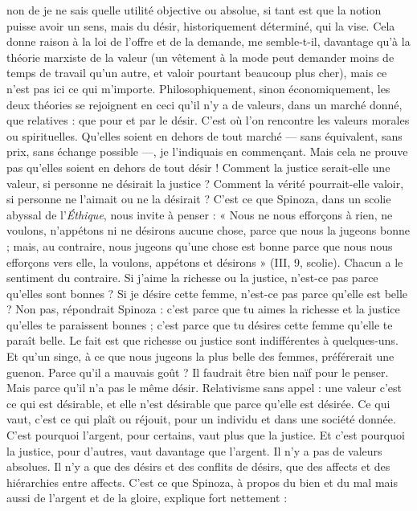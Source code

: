 non de je ne sais quelle utilité objective ou absolue, si tant est que la
notion puisse avoir un sens, mais du désir, historiquement déterminé, qui la
vise. Cela donne raison à la loi de l'offre et de la demande, me semble-t-il,
davantage qu’à la théorie marxiste de la valeur (un vêtement à la mode peut
demander moins de temps de travail qu’un autre, et valoir pourtant beaucoup
plus cher), mais ce n’est pas ici ce qui m'importe. Philosophiquement, sinon
économiquement, les deux théories se rejoignent en ceci qu’il n’y a de valeurs,
dans un marché donné, que relatives : que pour et par le désir. C’est où l’on
rencontre les valeurs morales ou spirituelles. Qu’elles soient en dehors de tout
marché — sans équivalent, sans prix, sans échange possible —, je l’indiquais en
commençant. Mais cela ne prouve pas qu’elles soient en dehors de tout désir !
Comment la justice serait-elle une valeur, si personne ne désirait la justice ?
Comment la vérité pourrait-elle valoir, si personne ne l’aimait ou ne la
désirait ? C’est ce que Spinoza, dans un scolie abyssal de l’{\it Éthique}, nous invite
à penser : « Nous ne nous efforçons à rien, ne voulons, n’appétons ni ne désirons
aucune chose, parce que nous la jugeons bonne ; mais, au contraire, nous
jugeons qu’une chose est bonne parce que nous nous efforçons vers elle, la voulons,
appétons et désirons » (III, 9, scolie). Chacun a le sentiment du contraire.
Si j'aime la richesse ou la justice, n’est-ce pas parce qu’elles sont bonnes ? Si je
désire cette femme, n’est-ce pas parce qu’elle est belle ? Non pas, répondrait
Spinoza : c’est parce que tu aimes la richesse et la justice qu’elles te paraissent
bonnes ; c’est parce que tu désires cette femme qu’elle te paraît belle. Le fait est
que richesse ou justice sont indifférentes à quelques-uns. Et qu’un singe, à ce
que nous jugeons la plus belle des femmes, préférerait une guenon. Parce qu’il
a mauvais goût ? Il faudrait être bien naïf pour le penser. Mais parce qu’il n’a
pas le même désir. Relativisme sans appel : une valeur c’est ce qui est désirable,
et elle n’est désirable que parce qu’elle est désirée. Ce qui vaut, c’est ce qui plaît
ou réjouit, pour un individu et dans une société donnée. C’est pourquoi
l'argent, pour certains, vaut plus que la justice. Et c’est pourquoi la justice,
pour d’autres, vaut davantage que l’argent. Il n’y a pas de valeurs absolues. Il
n'y a que des désirs et des conflits de désirs, que des affects et des hiérarchies
entre affects. C’est ce que Spinoza, à propos du bien et du mal mais aussi de
l'argent et de la gloire, explique fort nettement :

